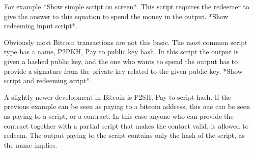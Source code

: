 For example *Show simple script on screen*. This script requires the redeemer
to give the answer to this equation to spend the money in the output.
*Show redeeming input script*.

Obviously most Bitcoin transactions are not this basic. The most common
script type has a name, P2PKH, Pay to public key hash. In this script
the output is given a hashed public key, and the one who wants to
spend the output has to provide a signature from the private key related to the
given public key. *Show script and redeeming script*

A slightly newer development in Bitcoin is P2SH, Pay to script hash.
If the previous example can be seen as paying to a bitcoin address,
this one can be seen as paying to a script, or a contract.
In this case anyone who can provide the contract together with
a partial script that makes the contact valid, is allowed to redeem.
The output paying to the script contains only the hash of the script,
as the name implies.
